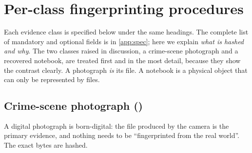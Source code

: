 \section{Per-class fingerprinting procedures}
\label{sec:classes}

Each evidence class is specified below under the same headings. The complete list of mandatory and optional fields is in \cref{app:spec}; here we explain \emph{what is hashed and why}. The two classes raised in discussion, a crime-scene photograph and a recovered notebook, are treated first and in the most detail, because they show the contrast clearly. A photograph \emph{is} its file. A notebook is a physical object that can only be represented by files.

\newcommand{\cardrow}[2]{\textbf{#1} & #2 \\ \addlinespace[2pt]}
\newenvironment{classcard}{\par\smallskip\noindent\small\tabularx{\linewidth}{@{}>{\raggedright\arraybackslash}p{2.7cm}X@{}}\toprule}{\bottomrule\endtabularx\par\medskip}

\subsection{Crime-scene photograph ()}
\label{sec:cls-photo}
A digital photograph is born-digital: the file produced by the camera is the primary evidence, and nothing needs to be \enquote{fingerprinted from the real world}. The exact bytes are hashed.

